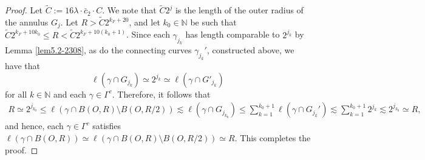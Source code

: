 \documentclass[10pt]{amsart}
\numberwithin{equation}{section}
\newcommand{\N}{\mathbb{N}}
\newcommand{\wtil}{\widetilde}
\begin{document}
\begin{proof}
Let $\wtil C:=16 \lambda\cdot \bar c_2\cdot C$.  We note that $\wtil C2^j$ is the length of the outer radius of the annulus $G_j$.  Let $R>\wtil C 2^{k_F+20}$, and let $k_0\in\N$ be such that $\wtil C2^{k_F+10k_0}\le R<\wtil C 2^{k_F+10(k_0+1)}$.  Since each $\gamma_{j_k}$ has length comparable to $2^{j_k}$ by Lemma \ref{lem5.2-2308}, as do the connecting curves $\gamma_{j_k}'$, constructed above, we have that  
\[
\ell(\gamma\cap G_{j_k})\simeq 2^{j_k}\simeq\ell(\gamma\cap G'_{j_k})
\]
for all $k\in\N$ and each $\gamma\in\Gamma^c$. Therefore, it follows that 
\begin{align*}
    R\simeq 2^{j_{k_0}}\leq \ell (\gamma\cap  B(O,R)\setminus B(O,R/2))\lesssim \ell(\gamma\cap G_{j_{k_0}}) \le\sum_{k=1}^{k_0+1}\ell(\gamma\cap G_{j_k}')\lesssim\sum_{k=1}^{k_0+1} 2^{j_k}\lesssim 2^{j_{k_0}}\simeq R,
\end{align*}
and hence, each $\gamma\in\Gamma^c$ satisfies  $\ell(\gamma\cap B(O,R))\simeq \ell(\gamma\cap B(O,R)\setminus B(O,R/2))\simeq R$.
This completes the proof.\qedhere


\end{proof}
\end{document}
